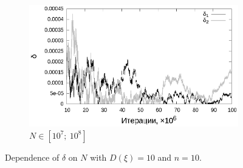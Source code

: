 \documentclass[11pt,a4paper]{article}
\theoremstyle{definition}
\begin{document}
\begin{figure}[h!]
\begin{subfigure}[b]{0.3\textwidth}
    \includegraphics[width=\textwidth]{figs/classic/linear_log_1x_2_samples_10_variance_10_norm.log_end.eps}
    \caption{$N \in [10^7;~10^8]$}
    \label{fig:classic_var10_n10_end}
  \end{subfigure}
  \caption{Dependence of $\delta$ on $N$ with $D(\xi) = 10$ and $n = 10$.}
  \label{fig:classic_var10_n10}
\end{figure}
\end{document}
